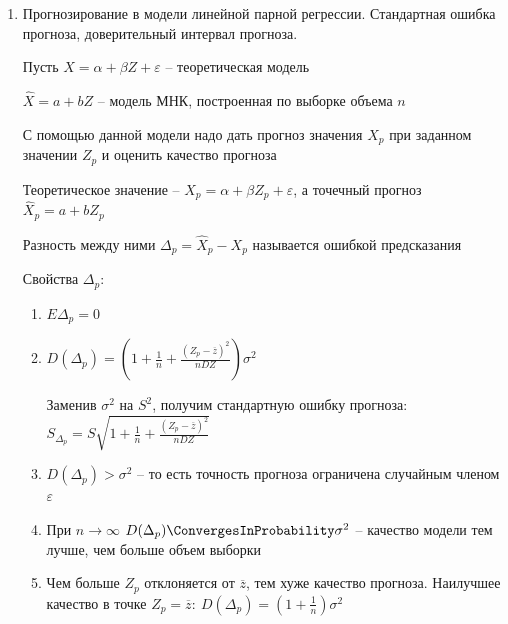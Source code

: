\begin{enumerate}
    \Defs $S_a$ и $S_b$ называются стандартным ошибками коэффициентов регрессии

    Пусть $t_\gamma$ -- квантиль $|T_{n - 2}|$ уровня $\gamma$

    Тогда доверительные интервалы надежности $\gamma$ для параметров $\alpha$ и $\beta$:

    $\qquad \alpha: (a - t_\gamma S_a; a + t_\gamma S_a)$

    $\qquad \beta: (b - t_\gamma S_b; b + t_\gamma S_b)$

    \item Прогнозирование в модели линейной парной регрессии. Стандартная ошибка прогноза, доверительный интервал прогноза.

    Пусть $X = \alpha + \beta Z + \varepsilon$ -- теоретическая модель

    $\hat X = a + b Z$ -- модель МНК, построенная по выборке объема $n$

    С помощью данной модели надо дать прогноз значения $X_p$ при заданном значении $Z_p$ и оценить качество прогноза 

    Теоретическое значение -- $X_p = \alpha + \beta Z_p + \varepsilon$, а точечный прогноз $\hat X_p = a + b Z_p$

    Разность между ними $\Delta_p = \hat X_p - X_p$ называется ошибкой предсказания

    Свойства $\Delta_p$:

    \begin{enumerate}
        \item $E \Delta_p = 0$
        \item $D (\Delta_p) = \left(1 + \frac{1}{n} + \frac{(Z_p - \overline{z})^2}{n DZ}\right) \sigma^2$

        Заменив $\sigma^2$ на $S^2$, получим стандартную ошибку прогноза: $S_{\Delta_p} = S \sqrt{1 + \frac{1}{n} + \frac{(Z_p - \overline{z})^2}{n DZ}}$

        \item $D(\Delta_p) > \sigma^2$ -- то есть точность прогноза ограничена случайным членом $\varepsilon$

        \item При $n \to \infty$ $D(\Delta_p) \ConvergesInProbability \sigma^2$ -- качество модели тем лучше, чем больше объем выборки

        \item Чем больше $Z_p$ отклоняется от $\overline{z}$, тем хуже качество прогноза. Наилучшее качество в точке $Z_p = \overline{z}: \ D(\Delta_p) = \left(1 + \frac{1}{n}\right) \sigma^2$


\end{enumerate}
\end{enumerate}
